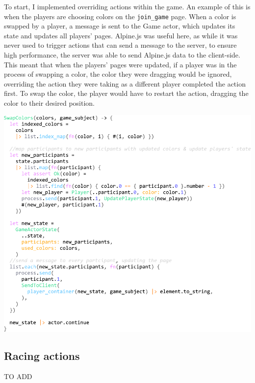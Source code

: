 \documentclass[]{final}
\begin{document}
\begin{minipage}[t]{18em}

  To start, I implemented overriding actions within the game. An example of this
  is when the players are choosing colors on the \lstinline|join_game| page. When
  a color is swapped by a player, a message is sent to the Game actor, which
  updates its state and updates all players' pages. Alpine.js was useful here,
  as while it was never used to trigger actions that can send a message to the
  server, to ensure high performance, the server was able to send Alpine.js data
  to the client-side. This meant that when the players' pages were updated,
  if a player was in the process of swapping a color, the color they were dragging
  would be ignored, overriding the action they were taking as a different player
  completed the action first. To swap the color, the player would have to restart
  the action, dragging the color to their desired position.

\end{minipage}
\hfill
\begin{minipage}[t]{20em}
  \includegraphics[width=\linewidth]{swap_colors.pdf}
  \label{fig: 15}
\end{minipage}

\newpage

\subsection{Racing actions}
TO ADD
\end{document}
